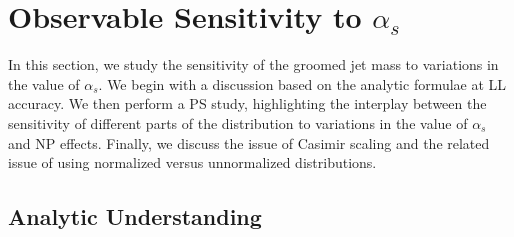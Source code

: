 \documentclass[11pt]{cernrep}
\begin{document}
\section{Observable Sensitivity to $\alpha_s$}
\label{jetsub_alphas_sec:jetmass}

In this section, we study the sensitivity of the groomed jet mass to variations in the value of $\alpha_s$.
%
We begin with a discussion based on the analytic formulae at LL accuracy.
%
We then perform a PS study, highlighting the interplay between the sensitivity of different parts of the distribution to variations in the value of $\alpha_s$ and NP effects.
%
Finally, we discuss the issue of Casimir scaling and the related issue of using normalized versus unnormalized distributions.


\subsection{Analytic Understanding}
\label{jetsub_alphas_sec:analytic}
\end{document}

